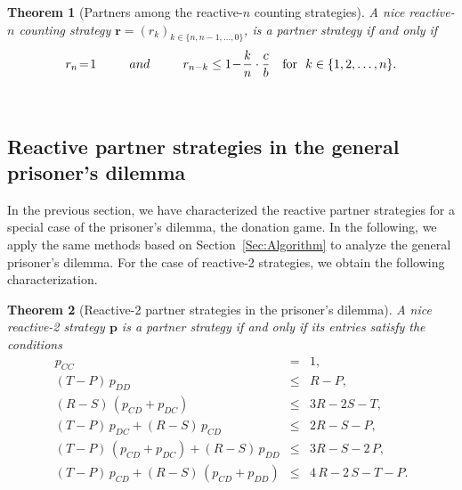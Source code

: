 \documentclass[9pt,twoside,lineno]{pnas-new}
\theoremstyle{plainCl1}
\newtheorem{theorem}{Theorem}
\theoremstyle{plainCl2}
\begin{document}
\begin{theorem}[Partners among the reactive-$n$ counting strategies]\label{theorem:reactive_counting_partner_strategies}
A nice reactive-$n$ counting strategy $\mathbf{r}\!=\!(r_k)_{k \in \{n, n-1, \dots, 0\}}$,
is a partner strategy if and only if
\begin{equation} \label{Eq:PartnerCounting}
  r_n \!=\! 1 \qquad ~~and~~ \qquad r_{n - k} \le 1 \!-\! \frac{k}{n} \cdot \frac{c}{b} ~~~\text{\normalfont for }~ k \in \{1, 2, \dots, n\}.
\end{equation}
\end{theorem}
~


\subsection{Reactive partner strategies in the general prisoner's dilemma}\label{section:general_prisoners_dilemma}

In the previous section, we have characterized the reactive partner strategies for a special case of the prisoner's dilemma, the donation game. 
In the following, we apply the same methods based on Section~\ref{Sec:Algorithm} to analyze the general prisoner's dilemma. 
For  the case of reactive-2 strategies, we obtain the following characterization. 


\begin{theorem}[Reactive-2 partner strategies in the prisoner's dilemma]
\label{theorem:reactive_two_partner_strategies_PD}
A nice reactive-2 strategy $\mathbf{p}$ is a partner strategy if and only if its entries satisfy the conditions
\begin{equation}
  \begin{array}{rcl}
    p_{CC} & = & 1, \\
    (T - P)\, p_{DD} & \le & R - P, \\ 
    (R - S)\, (p_{CD} + p_{DC}) & \le & 3 R - 2 S - T, \\
    (T - P)\, p_{DC}  + (R - S)\, p_{CD} & \le & 2 R - S - P, \\ 
    (T - P)\, (p_{CD} + p_{DC}) + (R - S)\, p_{DD}  & \le & 3 R - S - 2\,P, \\
    (T - P)\, p_{CD}  + (R - S)\, (p_{CD} + p_{DD}) & \le & 4\,R - 2\,S  - T- P.
\end{array}
\end{equation}
\end{theorem}
\end{document}
